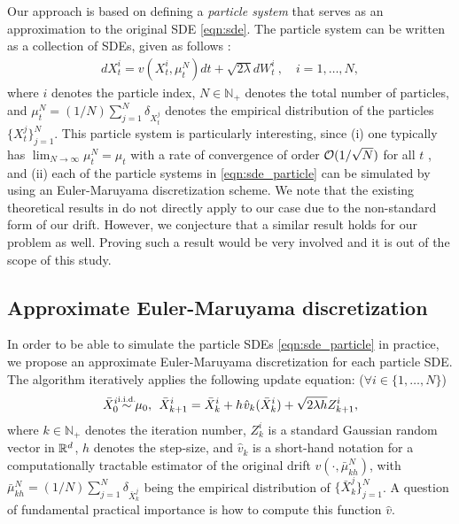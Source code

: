 Our approach is based on defining a \emph{particle system} that serves as an approximation to the original SDE \eqref{eqn:sde}. The particle system can be written as a collection of SDEs, given as follows \cite{bossy1997stochastic}:
\begin{align}
d X_t^i = v(X_t^i, \mu_t^{N}) dt + \sqrt{2 \lambda } d W_t^i \> , \quad i = 1,\dots, N, \label{eqn:sde_particle}
\end{align}
where $i$ denotes the particle index, $N \in \mathbb{N}_+$ denotes the total number of particles, and $\mu_t^N = (1/N) \sum_{j=1}^N \delta_{X_t^j}$ denotes the empirical distribution of the particles $\{X_t^j\}_{j=1}^N$. This particle system is particularly interesting, since (i) one typically has $\lim_{N \rightarrow \infty} \mu_t^{N}= \mu_t $ with a rate of convergence of order ${\cal O}(1/\sqrt{N})$ for all $t$ \cite{malrieu03,cgm-08}, and (ii) each of the particle systems in \eqref{eqn:sde_particle} can be simulated by using an Euler-Maruyama discretization scheme. We note that the existing theoretical results in \cite{veretennikov2006ergodic,mishura2016existence} do not directly apply to our case due to the non-standard form of our drift. However, we conjecture that a similar result holds for our problem as well. Proving such a result would be very involved and it is out of the scope of this study.

\subsection{Approximate Euler-Maruyama discretization}
%
In order to be able to simulate the particle SDEs \eqref{eqn:sde_particle} in practice, we propose an approximate Euler-Maruyama discretization for each particle SDE.
The algorithm iteratively applies the following update equation: ($\forall i \in  \{1,\dots,N\}$)
%
\begin{align}
\bar{X}^i_0 \simiid \mu_0, \>\> \bar{X}^i_{k+1} = \bar{X}^i_k + h \hspace{0.5pt} \hat{v}_k(\bar{X}^i_k) + \sqrt{2 \lambda h} Z^i_{k+1}, \label{eqn:euler_particle}
\end{align}
where $k \in \mathbb{N}_+$ denotes the iteration number, $Z^i_k$ is a standard Gaussian random vector in $\mathbb{R}^d$, $h$ denotes the step-size, and $\hat{v}_k$ is a short-hand notation for a computationally tractable estimator of the original drift $v(\cdot, \bar{\mu}_{kh}^N)$, with $\bar{\mu}_{kh}^{N} = (1/N) \sum_{j=1}^N \delta_{\bar{X}_k^j}$ being the empirical distribution of $\{\bar{X}_k^j\}_{j=1}^N$. A question of fundamental practical importance is how to compute this function $\hat{v}$.

